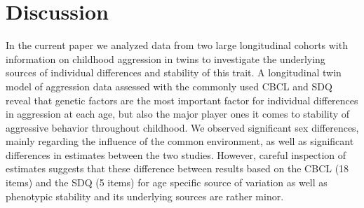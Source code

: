 ﻿\section{Discussion}

In the current paper we analyzed data from two large longitudinal cohorts with information on childhood aggression in twins to investigate the underlying sources of individual differences and stability of this trait.
A longitudinal twin model of aggression data assessed with the commonly used CBCL and SDQ reveal that genetic factors are the most important factor for individual differences in aggression at each age, but also the major player ones it comes to stability of aggressive behavior throughout childhood.
We observed significant sex differences, mainly regarding the influence of the common environment, as well as significant differences in estimates between the two studies.
However, careful inspection of estimates suggests that these difference between results based on the CBCL (18 items) and the SDQ (5 items) for age specific source of variation as well as phenotypic stability and its underlying sources are rather minor. 

